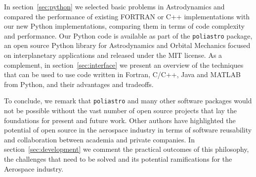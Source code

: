 In section~\ref{sec:python} we selected basic problems in Astrodynamics and compared the performance of existing FORTRAN or C++ implementations with our new Python implementations, comparing them in terms of code complexity and performance. Our Python code is available as part of the \verb|poliastro| package, an open source Python library for Astrodynamics and Orbital Mechanics focused on interplanetary applications and released under the MIT license\cite{Cano2016}. As a complement, in section~\ref{sec:interface} we present an overview of the techniques that can be used to use code written in Fortran, C/C++, Java and MATLAB from Python, and their advantages and tradeoffs.


To conclude, we remark that \verb|poliastro| and many other software packages would not be possible without the vast number of open source projects that lay the foundations for present and future work. Other authors have highlighted the potential of open source in the aerospace industry in terms of software reusability and collaboration between academia and private companies\citep{Ziemer2012}. In section~\ref{sec:development} we comment the practical outcomes of this philosophy, the challenges that need to be solved and its potential ramifications for the Aerospace industry.